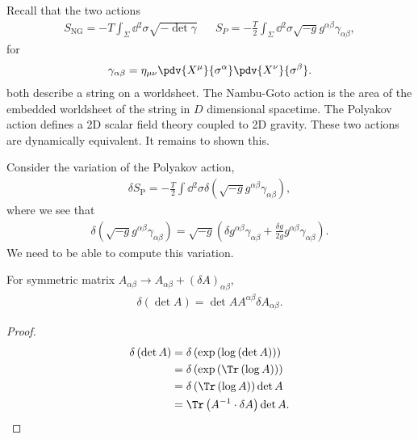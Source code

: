 
Recall that the two actions
\begin{align}
    S_\text{NG} = -T \int_\Sigma \dd{^2\sigma} \sqrt{-\det \gamma}  &&   S_P = -\frac{T}{2} \int_\Sigma \dd{^2\sigma} \sqrt{-g}  g^{\alpha \beta} \gamma_{\alpha \beta}
,\end{align}
for
\begin{align}
    \gamma_{\alpha \beta} =  \eta_{\mu \nu} \pdv{X^{\mu}}{\sigma^{\alpha}} \pdv{X^{\nu}}{\sigma^{\beta}}
.\end{align}
both describe a string on a worldsheet. The Nambu-Goto action is the area of the embedded worldsheet of the string in $D$ dimensional spacetime. The Polyakov action defines a 2D scalar field theory coupled to 2D gravity. These two actions are dynamically equivalent. It remains to shown this.

Consider the variation of the Polyakov action,
\begin{align}\label{eq:poly_var}
    \delta S_\text{P} = -\frac{T}{2} \int \dd{^2 \sigma} \delta \left( \sqrt{-g} g^{\alpha \beta} \gamma_{\alpha \beta} \right)
,\end{align}
where we see that
\begin{align}
    \delta \left( \sqrt{-g} g^{\alpha \beta} \gamma_{\alpha \beta} \right) = \sqrt{-g}  \left( \delta g^{\alpha \beta} \gamma_{\alpha \beta} + \frac{\delta g}{2 g} g^{\alpha \beta} \gamma_{\alpha \beta} \right) 
.\end{align}
We need to be able to compute this variation.

\begin{lemma}
    For symmetric matrix $A_{\alpha \beta} \to A_{\alpha \beta} + \left( \delta A \right)_{\alpha \beta} $,
    \begin{align}
        \delta \left( \det A \right) = \det A  A^{\alpha \beta} \delta A_{\alpha \beta}
    .\end{align}
\end{lemma}
\begin{proof}
    \begin{align}
        \delta \left( \det A \right) &= \delta \left( \exp \left( \log \left( \det A \right)  \right)  \right) \\
        &= \delta \left( \exp \left( \Tr \left( \log A \right)  \right)  \right)  \\
        &= \delta \left( \Tr \left( \log A \right)  \right) \det A  \\
        &= \Tr \left( A^{-1} \cdot \delta A \right)  \det A
    .\end{align}
\end{proof}

